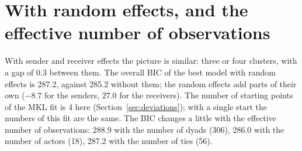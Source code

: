 \section{With random effects, and the effective number of observations}

With sender and receiver effects the picture is similar: three or four clusters, with a gap of 0.3 between them.
The overall BIC of the best model with random effects is 287.2, against 285.2 without them; the random effects add parts of their own ($-8.7$ for the senders, $27.0$ for the receivers). The number of starting points of the MKL fit is 4 here (Section~\ref{sec:deviations}); with a single start the numbers of this fit are the same. The BIC changes a little with the effective number of observations: 288.9 with the number of dyads (306), 286.0 with the number of actors (18), 287.2 with the number of ties (56).
